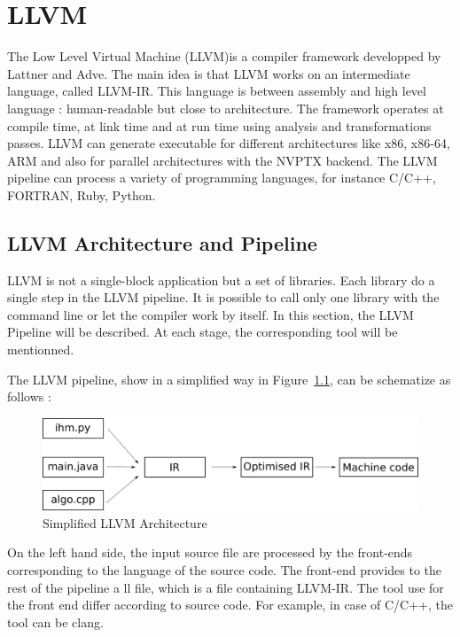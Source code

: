 \chapter{LLVM}\label{ch:LLVM}

The Low Level Virtual Machine (LLVM)is a compiler framework developped by Lattner and Adve. The main idea is that LLVM works on an intermediate language, called LLVM-IR. This language is between assembly and high level language : human-readable but close to architecture. The framework operates at compile time, at link time and at run time using analysis and transformations passes. LLVM can generate executable for different architectures like x86, x86-64, ARM and also for parallel architectures with the NVPTX backend. The LLVM pipeline can process a variety of programming languages, for instance C/C++, FORTRAN, Ruby, Python. 

\section{LLVM Architecture and Pipeline}
LLVM is not a single-block application but a set of libraries. Each library do a single step in the LLVM pipeline. It is possible to call only one library with the command line or let the compiler work by itself. In this section, the LLVM Pipeline will be described. At each stage, the corresponding tool will be mentionned.

The LLVM pipeline, show in a simplified way in Figure~\ref{fig:Architecture}, can be schematize as follows :

\begin{figure}
\centering
\includegraphics[scale=0.25]{gfx/LLVM/Architecture.png}
\caption{Simplified LLVM Architecture}
\label{fig:Architecture}
\end{figure}

On the left hand side, the input source file are processed by the front-ends corresponding to the language of the source code. The front-end provides to the rest of the pipeline a ll file, which is a file containing LLVM-IR. The tool use for the front end differ according to source code. For example, in case of C/C++, the tool can be clang.

